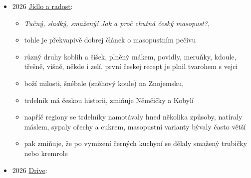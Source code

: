 \begin{itemize}
  \begin{itemize}
  \tightlist
  \item
    \emph{Češi to považují za národní tradici, ale jeho původ byste v
    Česku hledali marně},
  \item
    nejsem si jistej, jestli to je vážně míněnej článek, nebo AI slop,
    protože jeho obsah je vážně WTF. Po přečtení celýho článku si jsem
    jistej, že to je AI slop a odpad.
  \item
    podle výzkumu týmu vedeného profesorkou Annou Dvořákovou z Ústavu
    pro studium gastronomického dědictví se zkoumáním historických
    zdrojů došlo k tomu, že trdelník je importovaný fenomén, který si
    Praha přivlastnila v posledních dvou až třech dekádách

    \begin{itemize}
    \tightlist
    \item
      tak to je fakt AI slop, žádnej takovej ústav neexistuje
    \end{itemize}
  \item
    pak tvrdí, že Skalice získala na trdelník patentové právo v roce
    1783
  \end{itemize}
\item
  2026
  \href{https://www.jidloaradost.ambi.cz/clanky/tucny-sladky-smazeny-jak-a-proc-chutna-cesky-masopust}{Jídlo
  a radost}:

  \begin{itemize}
  \tightlist
  \item
    \emph{Tučný, sladký, smažený! Jak a proč chutná český masopust?},
  \item
    tohle je překvapivě dobrej článek o masopustním pečivu
  \item
    různý druhy koblih a šišek, plněný mákem, povidly, meruňky, kdoule,
    třešně, višně, někde i zelí. první českej recept je plnil tvarohem s
    vejci
  \item
    boží milosti, šnébale (sněhový koule) na Znojemsku,
  \item
    trdelník má českou historii, zmiňuje Němčičky a Kobylí
  \item
    napříč regiony se trdelníky namotávaly hned několika způsoby,
    natíraly máslem, sypaly ořechy a cukrem, masopustní varianty bývaly
    často větší
  \item
    pak zmiňuje, že po vymizení černých kuchyní se dělaly smažený
    trubičky nebo kremrole
  \end{itemize}
\item
  2026
  \href{https://drivemagazine.sk/gastro/skalicky-trdelnik-original/}{Drive}:


\end{itemize}
